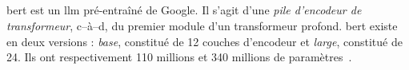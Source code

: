 \subsection{}

\Gls{bert} est un \gls{llm} pré-entraîné de Google.
Il s'agit d'une \emph{pile d'encodeur de transformeur},
c--à--d, du premier module d'un transformeur profond.
\gls{bert} existe en deux versions : 
\emph{base}, constitué de 12 couches d'encodeur et \emph{large}, constitué de 24. 
Ils ont respectivement 110 millions et 340 millions de paramètres~\cite{Devlin_Chang_Lee_Toutanova_2019}.

